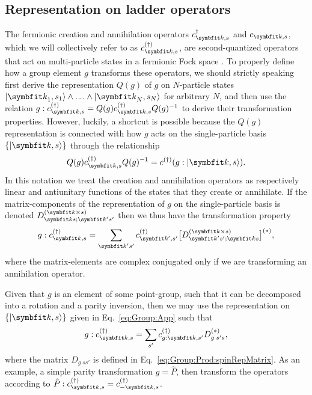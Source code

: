 \subsection{Representation on ladder operators}
\label{sec:Group:App:Ladder}

The fermionic creation and annihilation operators $c^\dagger_{\v{k},s}$ and $c_{\v{k},s}$, which we will collectively refer to as
$c^{(\dagger)}_{\v{k},s}$, are second-quantized operators that act on multi-particle
states in a fermionic Fock space \cite{NegeleOrland98}. To properly define how a group element $g$ transforms these operators, we should
strictly speaking first derive the representation $Q(g)$ of $g$ on $N$-particle states $\ket{\v{k}_1,s_1}\land\ldots\land\ket{\v{k}_N,s_N}$ for
arbitrary $N$, and then use the relation $g:c^{(\dagger)}_{\v{k},s} = Q(g)c^{(\dagger)}_{\v{k},s}Q(g)^{-1}$ to derive their transformation properties.
However, luckily, a shortcut is possible because the $Q(g)$ representation is connected with how $g$ acts on the single-particle basis
$\{\ket{\v{k},s}\}$ through the relationship
\begin{equation}
    \label{eq:Group:App:Ladder:quantizedRepToSingleParticleBasis}
    Q(g)c^{(\dagger)}_{\v{k},s}Q(g)^{-1} = c^{(\dagger)}(g:\ket{\v{k},s}).
\end{equation}
In this notation we treat the creation and annihilation operators as respectively linear and antiunitary functions of the states that they create or
annihilate. If the matrix-components of the representation of $g$ on the single-particle basis is denoted $D_{\v{k}s;\v{k}'s'}^{(\v{k}\times s)}$ then
we thus have the transformation property
\begin{equation}
    \label{eq:Group:App:Ladder:generalTransformationBehavior}
    g:c^{(\dagger)}_{\v{k},s} = \sum_{\v{k}'s'}c^{(\dagger)}_{\v{k}',s'}\big[D_{\v{k}'s';\v{k}s}^{(\v{k}\times s)}\big]^{(\ast)},
\end{equation}
where the matrix-elements are complex conjugated only if we are transforming an annihilation operator.

Given that $g$ is an element of some point-group, such that it can be decomposed into a rotation and a parity inversion, then we may use the
representation on $\{\ket{\v{k},s}\}$ given in Eq.~\eqref{eq:Group:App} such that
\begin{equation}
    \label{eq:Group:App:Ladder:pointGroupTransformation}
    g:c^{(\dagger)}_{\v{k},s} = \sum_{s'}c^{(\dagger)}_{g:\v{k},s'}D_{g\;s's}^{(\ast)},
\end{equation}
where the matrix $D_{g\;ss'}$ is defined in Eq.~\eqref{eq:Group:Prod:spinRepMatrix}. As an example, a simple parity transformation $g=\hat{P}$, then
transform the operators according to $\hat{P}:c^{(\dagger)}_{\v{k},s} = c^{(\dagger)}_{-\v{k},s}$.

